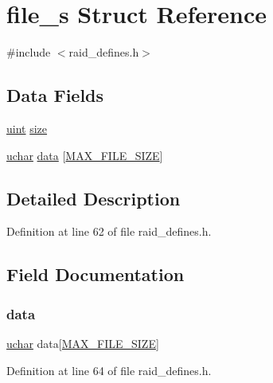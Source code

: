 \hypertarget{structfile__s}{}\section{file\+\_\+s Struct Reference}
\label{structfile__s}


{\ttfamily \#include $<$raid\+\_\+defines.\+h$>$}

\subsection*{Data Fields}
\begin{DoxyCompactItemize}
\item 
\hyperlink{raid__defines_8h_a91ad9478d81a7aaf2593e8d9c3d06a14}{uint} \hyperlink{structfile__s_a22d26304a3b3aca97e6311f6939dd1bf}{size}
\item 
\hyperlink{raid__defines_8h_a65f85814a8290f9797005d3b28e7e5fc}{uchar} \hyperlink{structfile__s_a5f05d979f42df3908fb0f491f6c65256}{data} \mbox{[}\hyperlink{raid__defines_8h_a649ad5274d988d17a275a3cead056746}{M\+A\+X\+\_\+\+F\+I\+L\+E\+\_\+\+S\+I\+ZE}\mbox{]}
\end{DoxyCompactItemize}


\subsection{Detailed Description}


Definition at line 62 of file raid\+\_\+defines.\+h.



\subsection{Field Documentation}
\mbox{\label{structfile__s_a5f05d979f42df3908fb0f491f6c65256}} 
\subsubsection{\texorpdfstring{data}{data}}
{\footnotesize\ttfamily \hyperlink{raid__defines_8h_a65f85814a8290f9797005d3b28e7e5fc}{uchar} data\mbox{[}\hyperlink{raid__defines_8h_a649ad5274d988d17a275a3cead056746}{M\+A\+X\+\_\+\+F\+I\+L\+E\+\_\+\+S\+I\+ZE}\mbox{]}}



Definition at line 64 of file raid\+\_\+defines.\+h.

